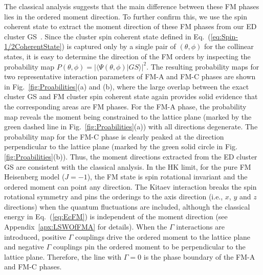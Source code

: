 \documentclass[aps,prb,reprint,amsfonts,amsmath,amssymb,showpacs,groupedaddress,superscriptaddress]{revtex4-1}
\begin{document}
The classical analysis suggests that the main difference between these FM phases lies in the ordered moment direction. To further confirm this, we use the spin coherent state to extract the moment direction of these FM phases from our ED cluster GS~\cite{PhysRevB.94.064435}. Since the cluster spin coherent state defined in Eq.~(\ref{eq:Spin-1/2CoherentState}) is captured only by a single pair of $(\theta, \phi)$ for the collinear states, it is easy to determine the direction of the FM orders by inspecting the probability map $P(\theta, \phi) = | \langle \Psi (\theta, \phi) | GS \rangle |^2$. The resulting probability maps for two representative interaction parameters of FM-A and FM-C phases are shown in Fig.~\ref{fig:Proabilities}(a) and (b), where the large overlap between the exact cluster GS and FM cluster spin coherent state again provides solid evidence that the corresponding areas are FM phases. For the FM-A phase, the probability map reveals the moment being constrained to the lattice plane (marked by the green dashed line in Fig.~\ref{fig:Proabilities}(a)) with all directions degenerate. The probability map for the FM-C phase is clearly peaked at the direction perpendicular to the lattice plane (marked by the green solid circle in Fig. \ref{fig:Proabilities}(b)). Thus, the moment directions extracted from the ED cluster GS are consistent with the classical analysis. In the HK limit, for the pure FM Heisenberg model ($J=-1$), the FM state is spin rotational invariant and the ordered moment can point any direction. The Kitaev interaction breaks the spin rotational symmetry and pins the orderings to the axis direction (i.e., $x$, $y$ and $z$ directions) when the quantum fluctuations are included, although the classical energy in Eq.~(\ref{eq:EcFM}) is independent of the moment direction (see Appendix~\ref{apx:LSWOfFMA} for details). When the $\Gamma$ interactions are introduced, positive $\Gamma$ couplings drive the ordered moment to the lattice plane and negative $\Gamma$ couplings pin the ordered moment to be perpendicular to the lattice plane. Therefore, the line with $\Gamma=0$ is the phase boundary of the FM-A and FM-C phases.
\end{document}
